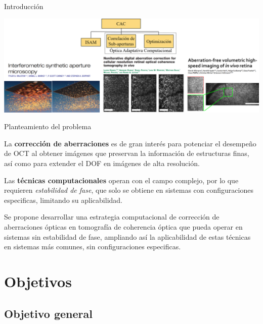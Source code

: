 \documentclass[fleqn,10pt,aspectratio=169,dvipsnames]{beamer}
\begin{document}
\begin{frame}[t]{Introducción}
\begin{center}
\begin{overprint}
\includegraphics[height=.55\textheight]{../Figuras/ProblemStatement_4.png}
		\end{overprint}
	\end{center}
\end{frame}

\begin{frame}[t]{Planteamiento del problema}
	\begin{center}
{ La \textbf{corrección de aberraciones} es de gran interés para potenciar el desempeño de OCT al obtener imágenes que preservan la información de estructuras finas, así como para extender el DOF en imágenes de alta resolución. \\}

\vspace{\baselineskip}
{Las \textbf{técnicas computacionales} operan con el {\color{coolBlue}campo complejo}, por lo que requieren \textit{estabilidad de fase}, que {\color{coolRed}solo se obtiene en sistemas con configuraciones especificas, limitando su aplicabilidad.} \\}

\vspace{\baselineskip}		
{ Se propone desarrollar una {\color{coolBlue}estrategia computacional de corrección de aberraciones ópticas} en tomografía de coherencia óptica que pueda {\color{coolBlue}operar en sistemas sin estabilidad de fase}, ampliando así la aplicabilidad de estas técnicas en sistemas más comunes, {\color{coolBlue}sin configuraciones especificas.} \\}
	\end{center}
\end{frame}

\section{Objetivos}
\subsection{Objetivo general}
\end{document}
